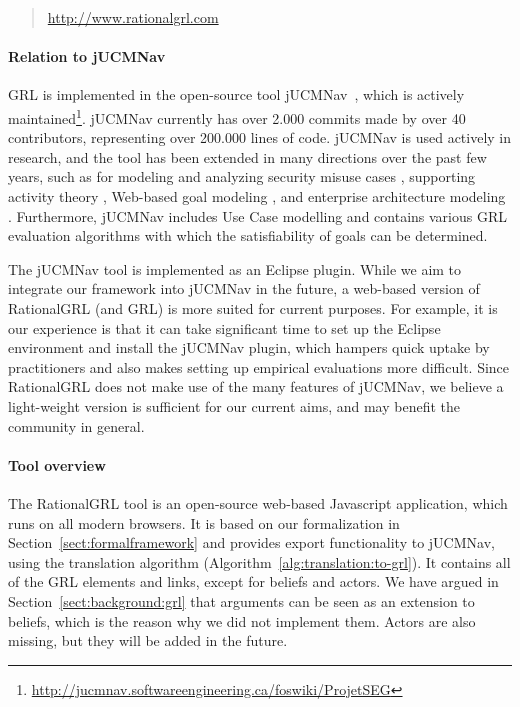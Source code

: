 \begin{quote}
\url{http://www.rationalgrl.com}
\end{quote}

\paragraph{Relation to jUCMNav} 

GRL is implemented in the open-source tool jUCMNav~\cite{jUCMNav}, which is actively maintained\footnote{\url{http://jucmnav.softwareengineering.ca/foswiki/ProjetSEG}}. jUCMNav currently has over 2.000 commits made by over 40 contributors, representing over 200.000 lines of code. jUCMNav is used actively in research, and the tool has been extended in many directions over the past few years, such as for modeling and analyzing security misuse cases \cite{}, supporting activity theory \cite{}, Web-based goal modeling \cite{}, and enterprise architecture modeling \cite{}.  Furthermore, jUCMNav includes Use Case modelling and contains various GRL evaluation algorithms with which the satisfiability of goals can be determined. 

The jUCMNav tool is implemented as an Eclipse plugin. While we aim to integrate our framework into jUCMNav in the future, a web-based version of RationalGRL (and GRL) is more suited for current purposes. For example, it is our experience is that it can take significant time to set up the Eclipse environment and install the jUCMNav plugin, which hampers quick uptake by practitioners and also makes setting up empirical evaluations more difficult. Since RationalGRL does not make use of the many features of jUCMNav, we believe a light-weight version is sufficient for our current aims, and may benefit the community in general. 

\paragraph{Tool overview} The RationalGRL tool is an open-source web-based Javascript application, which runs on all modern browsers. It is based on our formalization in Section~\ref{sect:formalframework} and provides export functionality to jUCMNav, using the translation algorithm (Algorithm~\ref{alg:translation:to-grl}). It contains all of the GRL elements and links, except for beliefs and actors. We have argued in Section~\ref{sect:background:grl} that arguments can be seen as an extension to beliefs, which is the reason why we did not implement them. Actors are also missing, but they will be added in the future.

